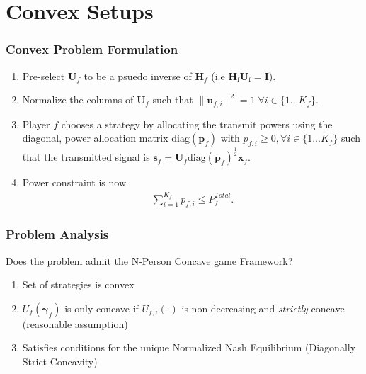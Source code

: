 \documentclass[10pt,tgadventor, onlymath]{beamer}
\begin{document}
\section{Convex Setups}

\begin{frame}
\frametitle{Convex Problem Formulation}
\begin{enumerate}
\item Pre-select $\mathbf{U}_f$ to be a psuedo inverse of $\mathbf{H}_f$  (i.e $\mathbf{H}_\mathrm{f}\mathbf{U}_\mathrm{f} = \mathbf{I}$).
\item 
	Normalize the columns of $\mathbf{U}_{f}$ such that 
	 $\|\mathbf{u}_{f,i}\|^2 =1 \;\forall i \in \{1 ... K_{f}\}$.
\item 
	Player $f$ chooses a strategy by allocating the transmit powers using the diagonal, power allocation  	
	matrix $\mathrm{diag}(\mathbf{p}_{f})$ with $p_{f,i} \geq 0, \forall i \in \{1 ... K_{f}\}$
such that the transmitted 		
	signal is 
	$\mathbf{s}_{f	}= \mathbf{U}_{f} 
	\mathrm{diag}(\mathbf{p}_{f})^{\frac{1}{2}}
	\mathbf{x}_{f}$.
\item 
	Power constraint is now 
	\begin{gather*}
	\sum_{i=1}^{K_{f}} p_{f,i}
	  \leq P^{Total}_{f}.
	  	\end{gather*}
\end{enumerate}
\end{frame}

\begin{frame}
\frametitle{Problem Analysis}
Does the problem admit the N-Person Concave game Framework? 
\\
\begin{enumerate}
\item  Set of strategies is convex \faThumbsOUp
\item  $U_{f}(\boldsymbol{\gamma}_{f})$ is only concave if 
	$U_{f,i}(\cdot)$ is non-decreasing and \emph{strictly} concave (reasonable assumption) \faThumbsOUp
\item 
	Satisfies conditions for the unique Normalized Nash Equilibrium (Diagonally Strict Concavity)  \faThumbsOUp
\end{enumerate}

\end{frame}
\end{document}
